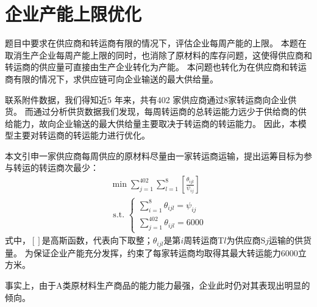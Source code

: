 
\section{企业产能上限优化}

题目中要求在供应商和转运商有限的情况下，评估企业每周产能的上限。
本题在取消生产企业每周产能上限的同时，也消除了原材料的库存问题，这使得供应商和转运商的供应量可直接由生产企业转化为产能。
本问题也转化为在供应商和转运商有限的情况下，求供应链可向企业输送的最大供给量。

联系附件数据，我们得知近5 年来，共有402 家供应商通过8家转运商向企业供货。
而通过分析供货数据我们发现，每周转运商的总转运能力远少于供给商的供给能力，故向企业输送的最大供给量主要取决于转运商的转运能力。
因此，本模型主要对转运商的转运能力进行优化。

本文引申一家供应商每周供应的原材料尽量由一家转运商运输，提出运筹目标为参与转运的转运商次最少：
\begin{equation}
\begin{array}{l}
\min \sum_{j=1}^{402} \sum_{l=1}^{8}\left[\frac{\theta_{i j l}}{\psi_{i j}}\right] \\
\text { s.t. }\left\{\begin{array}{l}
\sum_{i=1}^{8} \theta_{i j l}=\psi_{i j} \\
\sum_{j=1}^{402} \theta_{i j l}=6000
\end{array}\right.
\end{array}
\end{equation}
式中，$[]$是高斯函数，代表向下取整；$\theta_{i j l}$是第$i$周转运商T$l$为供应商S$j$运输的供货量。
为保证企业产能充分发挥，约束了每家转运商均取得其最大转运能力6000立方米。

事实上，由于A类原材料生产商品的能力能力最强，企业此时仍对其表现出明显的倾向。